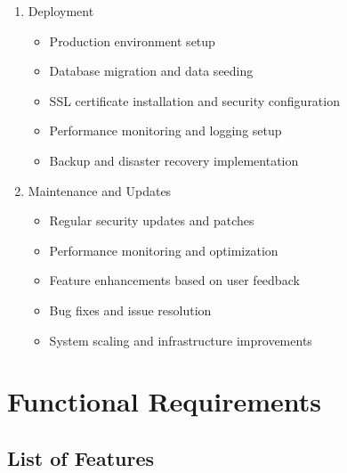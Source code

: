 \documentclass[12pt,a4paper]{report}
\begin{document}
\begin{enumerate}
    \item Deployment
    \begin{itemize}
        \item Production environment setup
        \item Database migration and data seeding
        \item SSL certificate installation and security configuration
        \item Performance monitoring and logging setup
        \item Backup and disaster recovery implementation
    \end{itemize}
    
    \item Maintenance and Updates
    \begin{itemize}
        \item Regular security updates and patches
        \item Performance monitoring and optimization
        \item Feature enhancements based on user feedback
        \item Bug fixes and issue resolution
        \item System scaling and infrastructure improvements
    \end{itemize}
\end{enumerate}

\chapter{Functional Requirements}

\section{List of Features}
\end{document}
